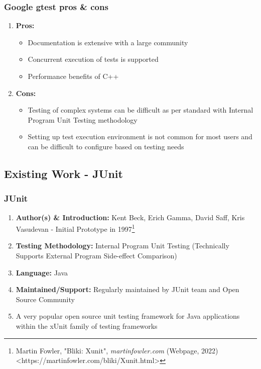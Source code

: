 \documentclass[xcolor]{beamer}
\begin{document}
\begin{frame}
	\frametitle{Google gtest pros \& cons}
	\begin{enumerate}
		\item \textbf{Pros:}
		\begin{itemize}
			\item Documentation is extensive with a large community
			\item Concurrent execution of tests is supported
			\item Performance benefits of C++
		\end{itemize}
			\pause
		\item \textbf{Cons:}
		\begin{itemize}
			\item Testing of complex systems can be difficult as per standard with Internal Program Unit Testing methodology
			\item Setting up test execution environment is not common for most users and can be difficult to configure based on testing needs
		\end{itemize}
	\end{enumerate}
\end{frame}

\subsection{Existing Work - JUnit}
\begin{frame}
	\frametitle{JUnit}
	\begin{enumerate}
		\setlength\itemsep{1em}
		\item \textbf{Author(s) \& Introduction:} Kent Beck, Erich Gamma, David Saff, Kris Vasudevan - Initial Prototype in 1997\footnote{Martin Fowler, "Bliki: Xunit", \textit{martinfowler.com} (Webpage, 2022) <https://martinfowler.com/bliki/Xunit.html>}
			\pause
		\item \textbf{Testing Methodology:} Internal Program Unit Testing (Technically Supports External Program Side-effect Comparison)
			\pause
		\item \textbf{Language:} Java
			\pause
		\item \textbf{Maintained/Support:} Regularly maintained by JUnit team and Open Source Community
			\pause 
		\item A very popular open source unit testing framework for Java applications within the xUnit family of testing frameworks
	\end{enumerate}
\end{frame}
\end{document}
